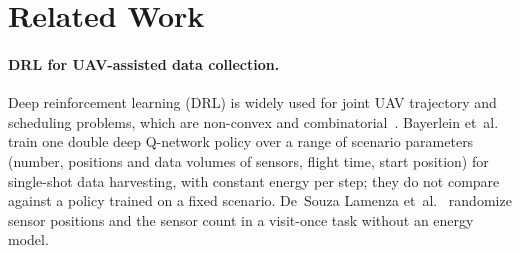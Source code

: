 %

\section{Related Work}

\paragraph{DRL for UAV-assisted data collection.}
Deep reinforcement learning (DRL) is widely used for joint UAV trajectory and scheduling
problems, which are non-convex and combinatorial~\cite{luong2019applications,zhao2025survey,amodu2025survey}.
Bayerlein et~al.~\cite{bayerlein2021multi} train one double deep Q-network policy over a
range of scenario parameters (number, positions and data volumes of sensors, flight time,
start position) for single-shot data harvesting, with constant energy per step; they do
not compare against a policy trained on a fixed scenario.
De~Souza Lamenza et~al.~\cite{lamenza2025} randomize sensor positions and the sensor count
in a visit-once task without an energy model.

